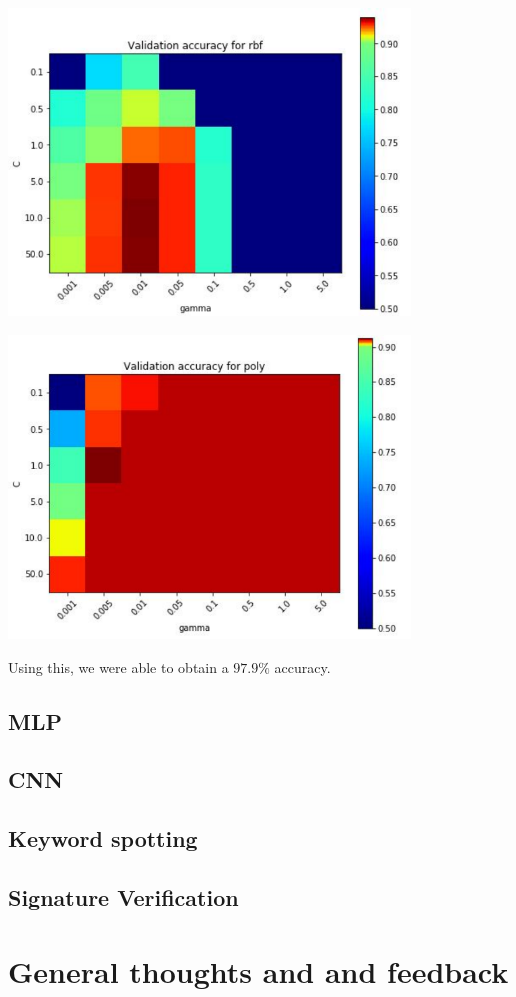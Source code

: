 \documentclass[a4paper,11pt]{report}
\begin{document}
\begin{minipage}{0.49\textwidth}
  \includegraphics[width=0.8\textwidth]{figures/hm1.pdf}
\end{minipage}
\hfill
\begin{minipage}{0.49\textwidth}
  \includegraphics[width=0.8\textwidth]{figures/hm2.pdf}
\end{minipage}

Using this, we were able to obtain a $97.9\%$ accuracy.

\subsection*{MLP}

\subsection*{CNN}

\subsection*{Keyword spotting}

\subsection*{Signature Verification}

\section*{General thoughts and and feedback}
\end{document}
